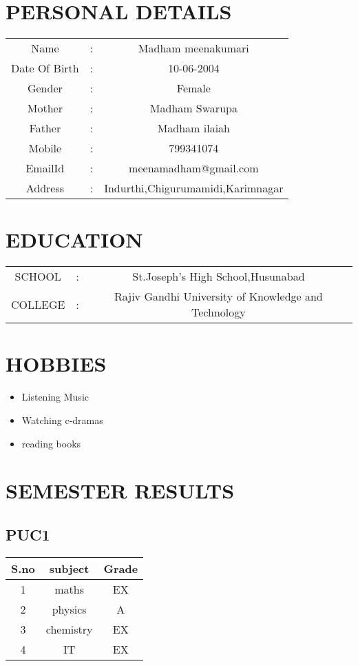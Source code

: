 

\section{PERSONAL DETAILS}
\begin{tabular}{c c c}
Name &:& Madham meenakumari\\
Date Of Birth &:& 10-06-2004\\

Gender &:& Female\\
Mother &:&Madham Swarupa\\
Father &:&Madham ilaiah\\
Mobile &:& 799341074\\
EmailId&:&meenamadham@gmail.com\\
Address &:& Indurthi,Chigurumamidi,Karimnagar\\

\end{tabular}
\section{EDUCATION}
\begin{tabular}{c c c}
 SCHOOL&:&St.Joseph's High School,Husunabad\\
 COLLEGE&:&Rajiv Gandhi University of Knowledge and Technology
\end{tabular}
\section{HOBBIES}
\begin{itemize}
\item Listening Music\\
\item Watching c-dramas\\
\item reading books\\
\end{itemize}
\section{SEMESTER RESULTS}
\subsection{PUC1}
\begin{tabular}{|c|c|c|}
\hline
 S.no&subject&Grade\\
 \hline
 1&maths&EX\\
 \hline
 2&physics&A\\
 \hline
 3&chemistry&EX\\
 \hline
 4&IT&EX\\
 \hline
\end{tabular}
